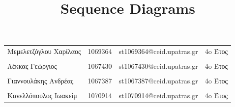 \documentclass{../ol-softwaremanual}
\begin{document}
	
	
	\begin{titlepage}
		
		
		\title{\en Sequence Diagrams \\}
		
	\end{titlepage}
	
	
	\maketitle
	
	\newpage
	
	
	\vspace{20pt}
	
	
	
	\begin{table}[htbp!]
		
		\begin{tabular}{llll}
			Μεμελετζόγλου Χαρίλαος & 1069364 & \en st1069364@ceid.upatras.gr & 4o Έτος   \\ 
			\\ Λέκκας Γεώργιος      &      1067430    &   \en st1067430@ceid.upatras.gr & 4o Έτος  \\
			\\ Γιαννουλάκης Ανδρέας        &   1067387       & \en st1067387@ceid.upatras.gr & 4o Έτος           \\
			\\ Κανελλόπουλος Ιωακείμ        &  1070914        &    \en st1070914@ceid.upatras.gr & 4o Έτος        \\ 
		\end{tabular}
	\end{table}
	
\end{document}
